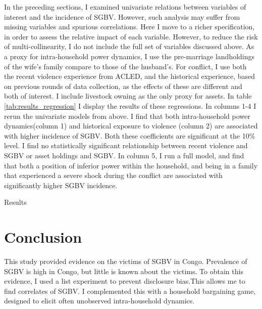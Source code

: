\documentclass[10pt,a4paper]{scrartcl} %
\newcommand{\tableloc}{C:/Users/Koen/Dropbox/PhD/Papers/CongoGBV/Tables}
\begin{document}
In the preceding sections, I examined univariate relations between variables of interest and the incidence of SGBV. However, such analysis may suffer from missing variables and spurious correlations. Here I move to a richer specification, in order to assess the relative impact of each variable. However, to reduce the risk of multi-collinearity, I do not include the full set of variables discussed above. As a proxy for intra-household power dynamics, I use the pre-marriage landholdings of the wife's family compare to those of the husband's. For conflict, I use both the recent violence experience from ACLED, and the historical experience, based on previous rounds of data collection, as the effects of these are different and both of interest. I include livestock owning as the only proxy for assets. In table \ref{tab:results_regression} I display the results of these regressions. In columns 1-4 I rerun the univariate models from above. I find that both intra-household power dynamics(column 1) and historical exposure to violence (column 2) are associated with higher incidence of SGBV. Both these coefficients are significant at the 10\% level. I find no statistically significant relationship between recent violence and SGBV or asset holdings and SGBV.  In column 5, I run a full model, and find that both a position of inferior power within the household, and being in a family that experienced a severe shock during the conflict are associated with significantly higher SGBV incidence.

\newcommand{\coeffget}[3]{\csvreader[filter=\equal{\reg}{#1} \and \equal{\var}{#2}]{\tableloc/regs.csv}{var=\var,reg=\reg,#3=\coeff}{\coeff}}

\begin{table}
	\caption{Results}\label{tab:results_regression}
	\begin{center}
	
	\end{center}
\end{table}


\section*{Conclusion}
This study provided evidence on the victims of SGBV in Congo. Prevalence of SGBV is high in Congo, but little is known about the victims. To obtain this evidence, I used a list experiment to prevent disclosure bias.This allows me to find correlates of SGBV. I complemented this with a household bargaining game, designed to elicit often unobserved intra-household dynamics.
\end{document}
